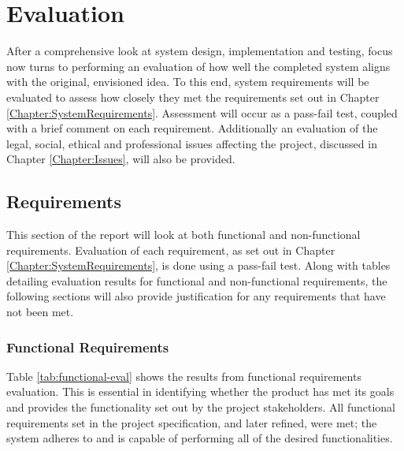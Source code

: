 \chapter{Evaluation}
\label{Chapter:Evaluation}
After a comprehensive look at system design, implementation and testing, focus now turns to performing an evaluation of how well the completed system aligns with the original, envisioned idea. To this end, system requirements will be evaluated to assess how closely they met the requirements set out in Chapter \ref{Chapter:SystemRequirements}. Assessment will occur as a pass-fail test, coupled with a brief comment on each requirement. Additionally an evaluation of the legal, social, ethical and professional issues affecting the project, discussed in Chapter \ref{Chapter:Issues}, will also be provided.

\section{Requirements}
This section of the report will look at both functional and non-functional requirements. Evaluation of each requirement, as set out in Chapter  \ref{Chapter:SystemRequirements}, is done using a pass-fail test. Along with tables detailing evaluation results for functional and non-functional requirements, the following sections will also provide justification for any requirements that have not been met.

\subsection{Functional Requirements}
Table \ref{tab:functional-eval} shows the results from functional requirements evaluation. This is essential in identifying whether the product has met its goals and provides the functionality set out by the project stakeholders. All functional requirements set in the project specification, and later refined, were met; the system adheres to and is capable of performing all of the desired functionalities. 

